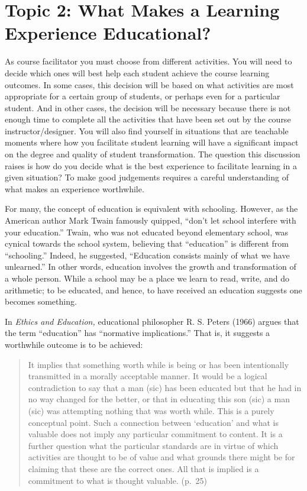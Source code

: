 \documentclass[
]{book}
\begin{document}
\hypertarget{topic-2-what-makes-a-learning-experience-educational}{%
\section*{Topic 2: What Makes a Learning Experience Educational?}\label{topic-2-what-makes-a-learning-experience-educational}}

As course facilitator you must choose from different activities. You will need to decide which ones will best help each student achieve the course learning outcomes. In some cases, this decision will be based on what activities are most appropriate for a certain group of students, or perhaps even for a particular student. And in other cases, the decision will be necessary because there is not enough time to complete all the activities that have been set out by the course instructor/designer. You will also find yourself in situations that are teachable moments where how you facilitate student learning will have a significant impact on the degree and quality of student transformation. The question this discussion raises is how do you decide what is the best experience to facilitate learning in a given situation? To make good judgements requires a careful understanding of what makes an experience worthwhile.

For many, the concept of education is equivalent with schooling. However, as the American author Mark Twain famously quipped, ``don't let school interfere with your education.'' Twain, who was not educated beyond elementary school, was cynical towards the school system, believing that ``education'' is different from ``schooling.'' Indeed, he suggested, ``Education consists mainly of what we have unlearned.'' In other words, education involves the growth and transformation of a whole person. While a school may be a place we learn to read, write, and do arithmetic; to be educated, and hence, to have received an education suggests one becomes something.

In \emph{Ethics and Education,} educational philosopher R. S. Peters (1966) argues that the term ``education'' has ``normative implications.'' That is, it suggests a worthwhile outcome is to be achieved:

\begin{quote}
It implies that something worth while is being or has been intentionally transmitted in a morally acceptable manner. It would be a logical contradiction to say that a man (sic) has been educated but that he had in no way changed for the better, or that in educating this son (sic) a man (sic) was attempting nothing that was worth while. This is a purely conceptual point. Such a connection between `education' and what is valuable does not imply any particular commitment to content. It is a further question what the particular standards are in virtue of which activities are thought to be of value and what grounds there might be for claiming that these are the correct ones. All that is implied is a commitment to what is thought valuable. (p.~25)
\end{quote}
\end{document}
